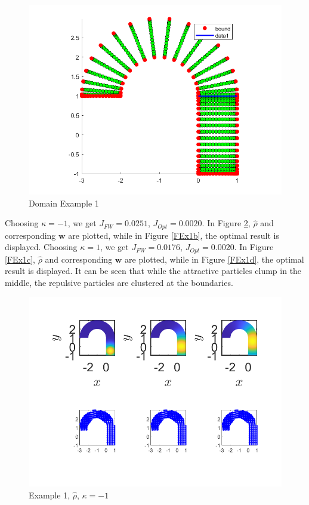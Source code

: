 \documentclass[11pt, a4paper]{article}
\theoremstyle{definition}
\newcommand{\w}{\mathbf{w}}
\begin{document}
\begin{figure}[h]
	\centering
	\includegraphics[scale=0.6]{Dom1.png}
	\caption{Domain Example 1} 
	\label{Dom1}
\end{figure}
Choosing $\kappa = -1$, we get $J_{FW} = 0.0251$, $J_{Opt} = 0.0020$. In Figure \ref{FEx1a}, $\widehat \rho$ and corresponding $\w$ are plotted, while in Figure \ref{FEx1b}, the optimal result is displayed. Choosing $\kappa = 1$, we get $J_{FW} = 0.0176$, $J_{Opt} = 0.0020$. In Figure \ref{FEx1c}, $\widehat \rho$ and corresponding $\w$ are plotted, while in Figure \ref{FEx1d}, the optimal result is displayed. It can be seen that while the attractive particles clump in the middle, the repulsive particles are clustered at the boundaries.
\begin{figure}[h]
	\centering
	\includegraphics[scale=0.6]{FW1n1.png}
	\caption{Example 1, $\widehat \rho$, $\kappa = -1$} 
	\label{FEx1a}
\end{figure}
\end{document}
